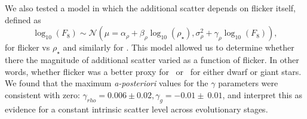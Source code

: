 We also tested a model in which the additional scatter depends on flicker
itself, defined as
\begin{equation}
	\log_{10}(F_8) \sim \mathcal{N} \left(\mu = \alpha_\rho +
    \beta_\rho \log_{10}(\rho_\star), \sigma_{\rho}^2 + \gamma_\rho
    \log_{10}(F_8)
    \right),
\end{equation}
\label{eq:rho2}
for flicker vs $\rho_\star$ and similarly for \logg.
This model allowed us to determine whether there the magnitude of additional
scatter varied as a function of flicker.
In other words, whether flicker was a better proxy for \logg\ or \rhostar\ for
either dwarf or giant stars.
We found that the maximum {\it a-posteriori} values for the $\gamma$
parameters were consistent with zero: $\gamma_{rho} = 0.006 \pm 0.02, \gamma_g
= -0.01 \pm\ 0.01$, and interpret this as evidence for a constant intrinsic
scatter level across evolutionary stages.

